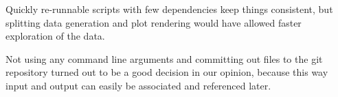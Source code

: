 \documentclass[../main.tex]{subfiles}
\begin{document}
Quickly re-runnable scripts with few dependencies keep things consistent, but splitting data generation and plot rendering would have allowed faster exploration of the data.

Not using any command line arguments and committing out files to the git repository turned out to be a good decision in our opinion, because this way input and output can easily be associated and referenced later.
\end{document}
